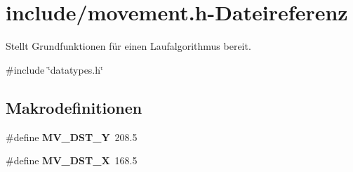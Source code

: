 \section{include/movement.h-\/Dateireferenz}
\label{movement_8h}


Stellt Grundfunktionen für einen Laufalgorithmus bereit.  


{\ttfamily \#include \char`\"{}datatypes.h\char`\"{}}\par
\subsection*{Makrodefinitionen}
\begin{DoxyCompactItemize}
\item 
\#define {\bf MV\_\-DST\_\-Y}~208.5
\item 
\#define {\bf MV\_\-DST\_\-X}~168.5
\end{DoxyCompactItemize}
